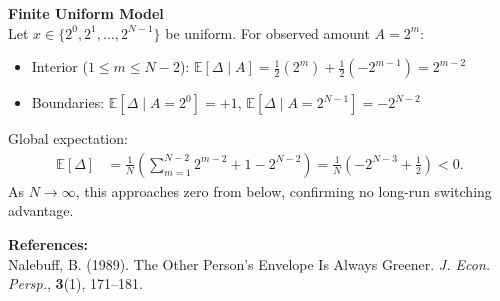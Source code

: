 \begin{technical}
\textbf{Finite Uniform Model}\\[0.5em]
Let $x \in \{2^0, 2^1, \dots, 2^{N-1}\}$ be uniform. For observed amount $A = 2^m$:
\begin{itemize}
\item Interior ($1 \le m \le N - 2$): $\mathbb{E}[\Delta \mid A] = \tfrac{1}{2}(2^m) + \tfrac{1}{2}(-2^{m-1}) = 2^{m-2}$
\item Boundaries: $\mathbb{E}[\Delta \mid A = 2^0] = +1$, $\mathbb{E}[\Delta \mid A = 2^{N-1}] = -2^{N-2}$
\end{itemize}
Global expectation:
\begin{align}
\mathbb{E}[\Delta] &= \frac{1}{N} \left( \sum_{m=1}^{N-2} 2^{m-2} + 1 - 2^{N-2} \right) = \frac{1}{N} \left( -2^{N-3} + \tfrac{1}{2} \right) < 0.
\end{align}
As $N \to \infty$, this approaches zero from below, confirming no long-run switching advantage.

\vspace{0.5em}
\textbf{References:}\\
Nalebuff, B. (1989). The Other Person’s Envelope Is Always Greener. \textit{J. Econ. Persp.}, \textbf{3}(1), 171--181.
\end{technical}
